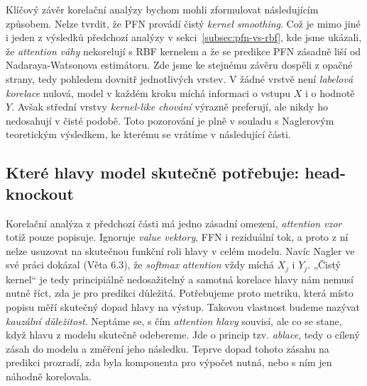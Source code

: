 Klíčový závěr korelační analýzy bychom mohli zformulovat následujícím způsobem.
Nelze tvrdit, že PFN provádí čistý \emph{kernel smoothing}.
Což je mimo jiné i jeden z výsledků předchozí analýzy v sekci~\ref{subsec:pfn-vs-rbf}, kde jsme ukázali, že \emph{attention váhy} nekorelují s RBF kernelem a že se predikce PFN zásadně liší od Nadaraya-Watsonova estimátoru.
Zde jsme ke stejnému závěru dospěli z opačné strany, tedy pohledem dovnitř jednotlivých vrstev.
V žádné vrstvě není \emph{labelová korelace} nulová, model v každém kroku míchá informaci o vstupu $X$ i o hodnotě $Y$.
Avšak střední vrstvy \emph{kernel-like chování} výrazně preferují, ale nikdy ho nedosahují v čisté podobě.
Toto pozorování je plně v souladu s Naglerovým teoretickým výsledkem, ke kterému se vrátíme v následující části.

\subsection{Které hlavy model skutečně potřebuje: head-knockout}
\label{subsec:ch2-knockout}

Korelační analýza z předchozí části má jedno zásadní omezení, \emph{attention vzor} totiž pouze popisuje.
Ignoruje \emph{value vektory}, FFN i reziduální tok, a proto z ní nelze usuzovat na skutečnou funkční roli hlavy v celém modelu.
Navíc Nagler ve své práci dokázal (Věta 6.3), že \emph{softmax} \emph{attention} vždy míchá $X_j$ i $Y_j$.
„Čistý kernel“ je tedy principiálně nedosažitelný a samotná korelace hlavy nám nemusí nutně říct, zda je pro predikci důležitá.
Potřebujeme proto metriku, která místo popisu měří skutečný dopad hlavy na výstup.
Takovou vlastnost budeme nazývat \textit{kauzální důležitost}.
Neptáme se, s čím \emph{attention hlavy} souvisí, ale co se stane, když hlavu z modelu skutečně odebereme.
Jde o princip tzv. \emph{ablace}, tedy o cílený zásah do modelu a změření jeho následku.
Teprve dopad tohoto zásahu na predikci prozradí, zda byla komponenta pro výpočet nutná, nebo s ním jen náhodně korelovala.
\par

